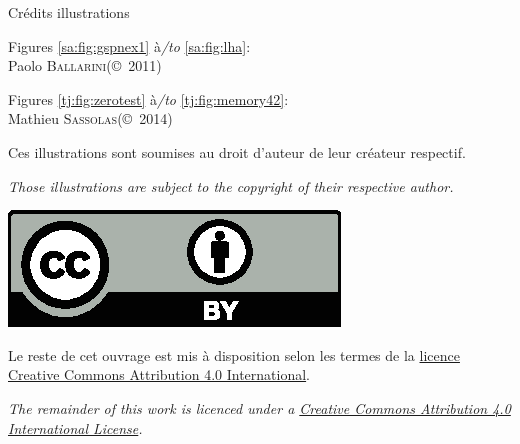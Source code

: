 \cleardoublepage
\thispagestyle{empty}
\setlength{\oddsidemargin}{100pt}
\setlength{\evensidemargin}{100pt}

\mbox{}
\vfill

\begin{minipage}{.6\textwidth}
\centering
{\Large Crédits illustrations}

\vspace{2cm}
Figures \ref{sa:fig:gspnex1} à\textit{/to} \ref{sa:fig:lha}:\\
Paolo \textsc{Ballarini}\quad(©~2011)
\medskip

Figures \ref{tj:fig:zerotest} à\textit{/to} \ref{tj:fig:memory42}:\\
Mathieu \textsc{Sassolas}\quad(©~2014)

\bigskip
Ces illustrations sont soumises au droit d'auteur de leur créateur respectif.

\medskip
\textit{Those illustrations are subject to the copyright of their respective author.}
\end{minipage}

\vfill

\begin{minipage}{.6\textwidth}
\centering
\href{https://creativecommons.org/licenses/by/4.0/deed.fr}{\includegraphics{Back/by.eps}}

\bigskip
Le reste de cet ouvrage est mis à disposition selon les termes de la
\href{https://creativecommons.org/licenses/by/4.0/deed.fr}{licence Creative Commons Attribution 4.0 International}.

\medskip
\textit{The remainder of this work is licenced under a
\href{https://creativecommons.org/licenses/by/4.0/deed.fr}{Creative Commons Attribution 4.0 International License}.}

\end{minipage}

\vfill
